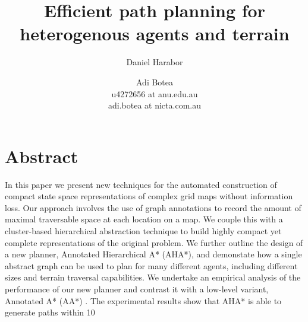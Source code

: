 \documentclass[letterpaper]{article}
\title{Efficient path planning for heterogenous agents and terrain}
\author{Daniel Harabor \and Adi Botea \\ u4272656 at anu.edu.au \\ adi.botea at nicta.com.au}
\begin{document}
\maketitle

\section{Abstract}
In this paper we present new techniques for the automated construction of compact state space representations of complex grid maps without information loss. Our approach involves the use of graph annotations to record the amount of maximal traversable space at each location on a map. We couple this with a cluster-based hierarchical abstraction technique to build highly compact yet complete representations of the original problem. We further outline the design of a new planner, Annotated Hierarchical A* (AHA*), and demonstate how a single abstract graph can be used to plan for many different agents, including different sizes and terrain traversal capabilities. 
We undertake an empirical analysis of the performance of our new planner and contrast it with a low-level variant, Annotated A* (AA*) . The experimental results show that AHA* is able to generate paths within 10%
\end{document}
